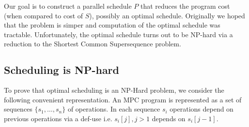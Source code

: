 Our goal is to construct a parallel schedule $P$ that reduces the program cost (when compared to cost of $S$), possibly an optimal schedule. 
Originally we hoped that the problem is simper and computation of the optimal schedule was tractable. Unfortunately, the optimal schedule turns out to be NP-hard via a reduction 
to the Shortest Common Supersequence problem.



\subsection{Scheduling is NP-hard}
\label{sec:np}

To prove that optimal scheduling is an NP-Hard problem, we consider the following convenient representation. An MPC program is represented as a set of sequences $\{s_1, \dots, s_n\}$ of operations. 
In each sequence $s_i$ operations depend on previous operations via a def-use i.e. $s_i[j], j > 1$ depends on $s_i[j-1]$. 

